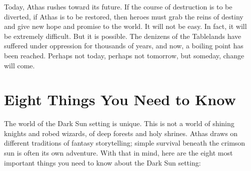 Today, Athas rushes toward its future. If the course of destruction is to be diverted, if Athas is to be restored,
then heroes must grab the reins of destiny and give new hope and promise to the world. It will not be easy. In fact, it will
be extremely difficult. But it is possible. The denizens of the Tablelands have suffered under oppression for thousands of
years, and now, a boiling point has been reached. Perhaps not today, perhaps not tomorrow, but someday, change will
come.

\section{Eight Things You Need to Know}

The world of the Dark Sun setting is unique. This is not a world of shining knights and robed wizards,
of deep forests and holy shrines. Athas draws on different traditions of fantasy storytelling; simple
survival beneath the crimson sun is often its own adventure. With that in mind, here are the eight most
important things you need to know about the Dark Sun setting:

